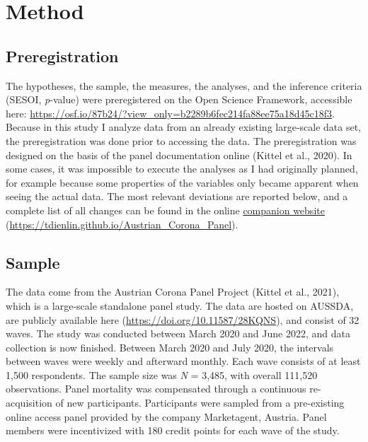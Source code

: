 \documentclass[
  man,floatsintext]{apa7}
\begin{document}
\hypertarget{method}{%
\section{Method}\label{method}}

\hypertarget{preregistration}{%
\subsection{Preregistration}\label{preregistration}}

The hypotheses, the sample, the measures, the analyses, and the inference criteria (SESOI, \emph{p}-value) were preregistered on the Open Science Framework, accessible here: \url{https://osf.io/87b24/?view_only=b2289b6fec214fa88ee75a18d45c18f3}.
Because in this study I analyze data from an already existing large-scale data set, the preregistration was done prior to accessing the data.
The preregistration was designed on the basis of the panel documentation online (Kittel et al., 2020).
In some cases, it was impossible to execute the analyses as I had originally planned, for example because some properties of the variables only became apparent when seeing the actual data.
The most relevant deviations are reported below, and a complete list of all changes can be found in the online \href{https://tdienlin.github.io/Austrian_Corona_Panel}{companion website} (\url{https://tdienlin.github.io/Austrian_Corona_Panel}).

\hypertarget{sample}{%
\subsection{Sample}\label{sample}}

The data come from the Austrian Corona Panel Project (Kittel et al., 2021), which is a large-scale standalone panel study.
The data are hosted on AUSSDA, are publicly available here (\url{https://doi.org/10.11587/28KQNS}), and consist of 32 waves.
The study was conducted between March 2020 and June 2022, and data collection is now finished.
Between March 2020 and July 2020, the intervals between waves were weekly and afterward monthly.
Each wave consists of at least 1,500 respondents.
The sample size was \emph{N} = 3,485, with overall 111,520 observations.
Panel mortality was compensated through a continuous re-acquisition of new participants.
Participants were sampled from a pre-existing online access panel provided by the company Marketagent, Austria.
Panel members were incentivized with 180 credit points for each wave of the study.
\end{document}
